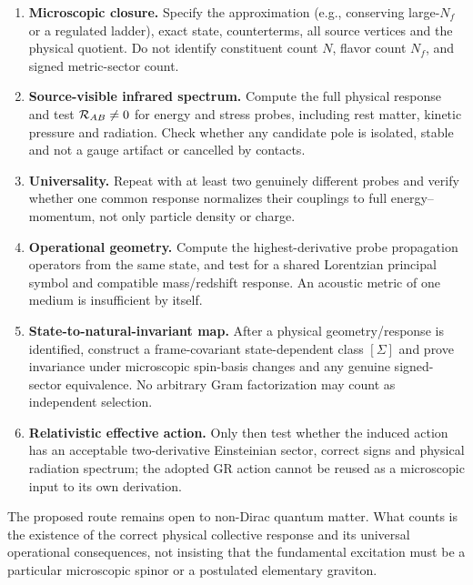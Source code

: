 \documentclass[11pt,a4paper]{article}
\begin{document}
\begin{enumerate}[label=\textbf{R\arabic*.},leftmargin=1.8em,itemsep=3pt]
\item \textbf{Microscopic closure.} Specify the approximation (e.g., conserving large-$N_f$ or a regulated ladder), exact state, counterterms, all source vertices and the physical quotient. Do not identify constituent count $N$, flavor count $N_f$, and signed metric-sector count.
\item \textbf{Source-visible infrared spectrum.} Compute the full physical response and test $\mathcal R_{AB}\ne0$ for energy and stress probes, including rest matter, kinetic pressure and radiation. Check whether any candidate pole is isolated, stable and not a gauge artifact or cancelled by contacts.
\item \textbf{Universality.} Repeat with at least two genuinely different probes and verify whether one common response normalizes their couplings to full energy--momentum, not only particle density or charge.
\item \textbf{Operational geometry.} Compute the highest-derivative probe propagation operators from the same state, and test for a shared Lorentzian principal symbol and compatible mass/redshift response. An acoustic metric of one medium is insufficient by itself.
\item \textbf{State-to-natural-invariant map.} After a physical geometry/response is identified, construct a frame-covariant state-dependent class $[\Sigma]$ and prove invariance under microscopic spin-basis changes and any genuine signed-sector equivalence. No arbitrary Gram factorization may count as independent selection.
\item \textbf{Relativistic effective action.} Only then test whether the induced action has an acceptable two-derivative Einsteinian sector, correct signs and physical radiation spectrum; the adopted GR action cannot be reused as a microscopic input to its own derivation.
\end{enumerate}

The proposed route remains open to non-Dirac quantum matter. What counts is the existence of the correct physical collective response and its universal operational consequences, not insisting that the fundamental excitation must be a particular microscopic spinor or a postulated elementary graviton.
\end{document}
